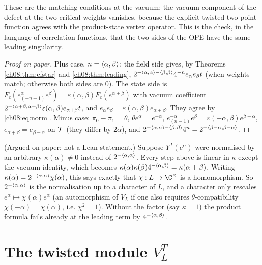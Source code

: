 \begin{physics}
These are the matching conditions at the vacuum: the vacuum component of the defect at the two critical weights vanishes, because the explicit twisted two-point function agrees with the product-state vertex operator. This is the check, in the language of correlation functions, that the two sides of the OPE have the same leading singularity.
\end{physics}
\begin{proof}[Proof on paper]
Plus case, $n=\langle \alpha,\beta\rangle$: the field side gives, by Theorems \ref{ch08:thm:cfstar} and
\ref{ch08:thm:leading}, $2^{-\langle \alpha,\alpha\rangle-\langle \beta,\beta\rangle}4^{-n}e_\alpha e_\beta t$
(when weights match; otherwise both sides are $0$).  The state side is
$F_c(e^\alpha_{(-n-1)}e^\beta)=\varepsilon(\alpha,\beta)F_c(e^{\alpha+\beta})$ with vacuum coefficient
$2^{-\langle \alpha+\beta,\alpha+\beta\rangle}\varepsilon(\alpha,\beta)e_{\alpha+\beta}t$, and
$e_\alpha e_\beta=\varepsilon(\alpha,\beta)e_{\alpha+\beta}$.  They agree by \eqref{ch08:eq:norm}.
Minus case: $\pi_0-\pi_1=\theta$, $\theta e^\alpha=e^{-\alpha}$,
$e^{-\alpha}_{(n-1)}e^\beta=\varepsilon(-\alpha,\beta)e^{\beta-\alpha}$, $e_{\alpha+\beta}=e_{\beta-\alpha}$ on
$\mathcal{T}$ (they differ by $2\alpha$), and $2^{-\langle \alpha,\alpha\rangle-\langle \beta,\beta\rangle}4^{n}=
2^{-\langle \beta-\alpha,\beta-\alpha\rangle}$.
\end{proof}

\begin{remark}\label{ch08:rem:normunique}
(Argued on paper; not a Lean statement.)  Suppose $Y^T(e^\alpha)$ were normalised by an arbitrary
$\kappa(\alpha)\ne0$ instead of $2^{-\langle \alpha,\alpha\rangle}$.  Every step above is linear in
$\kappa$ except the vacuum identity, which becomes $\kappa(\alpha)\kappa(\beta)4^{-\langle \alpha,\beta\rangle}
=\kappa(\alpha+\beta)$.  Writing $\kappa(\alpha)=2^{-\langle \alpha,\alpha\rangle}\chi(\alpha)$, this says
exactly that $\chi:L\to\C^\times$ is a homomorphism.  So $2^{-\langle \alpha,\alpha\rangle}$ is the
normalisation up to a character of $L$, and a character only rescales $e^\alpha\mapsto\chi(\alpha)e^\alpha$
(an automorphism of $V_L$ if one also requires $\theta$-compatibility $\chi(-\alpha)=\chi(\alpha)$, i.e.
$\chi^2=1$).  Without the factor (say $\kappa=1$) the product formula fails already at the leading
term by $4^{-\langle \alpha,\beta\rangle}$.
\end{remark}

\section{The twisted module \texorpdfstring{$V_L^T$}{VLT}}\label{ch08:sec:module}

